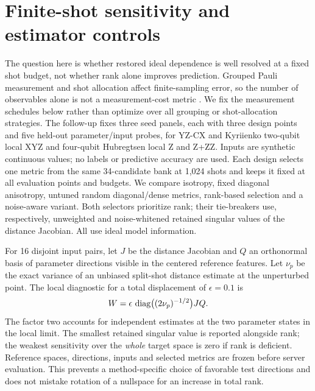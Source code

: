 \section{Finite-shot sensitivity and estimator controls}
\label{sec:shotdesign}
The question here is whether restored ideal dependence is well
resolved at a fixed shot budget, not whether rank alone improves
prediction. Grouped Pauli measurement and shot allocation affect
finite-sampling error, so the number of observables alone is not a
measurement-cost metric \cite{crawford2021efficient}. We fix the
measurement schedules below rather than optimize over all grouping
or shot-allocation strategies.
The follow-up fixes three seed panels, each with three design points
and five held-out parameter/input probes, for YZ-CX and Kyriienko
two-qubit local XYZ and four-qubit Hubregtsen local Z and Z+ZZ.
Inputs are synthetic continuous values; no labels or predictive
accuracy are used. Each design selects one metric from the same
34-candidate bank at 1,024 shots and keeps it fixed at all evaluation
points and budgets. We compare isotropy, fixed diagonal anisotropy,
untuned random diagonal/dense metrics, rank-based selection and a
noise-aware variant. Both selectors prioritize rank; their tie-breakers
use, respectively, unweighted and noise-whitened retained singular
values of the distance Jacobian. All use ideal model information.

For 16 disjoint input pairs, let $J$ be the distance Jacobian and
$Q$ an orthonormal basis of parameter directions visible in the
centered reference features. Let $\nu_p$ be the exact variance of an
unbiased split-shot distance estimate at the unperturbed point.
The local diagnostic for a total displacement of $\epsilon=0.1$ is
\begin{equation}
 W=\epsilon\,\operatorname{diag}\bigl((2\nu_p)^{-1/2}\bigr)JQ.
 \label{eq:shotwhiten}
\end{equation}
The factor two accounts for independent estimates at the two
parameter states in the local limit. The smallest retained singular
value is reported alongside rank; the weakest sensitivity over the
\emph{whole} target space is zero if rank is deficient. Reference
spaces, directions, inputs and selected metrics are frozen before
server evaluation. This prevents a method-specific choice of favorable
test directions and does not mistake rotation of a nullspace for
an increase in total rank.

